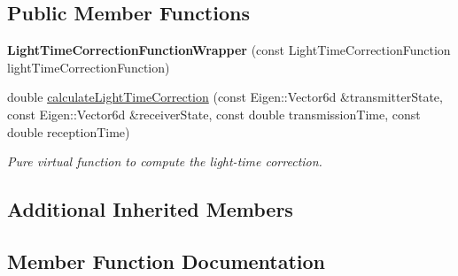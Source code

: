 \subsection*{Public Member Functions}
\begin{DoxyCompactItemize}
\item 
{\bfseries Light\+Time\+Correction\+Function\+Wrapper} (const Light\+Time\+Correction\+Function light\+Time\+Correction\+Function)\hypertarget{classtudat_1_1observation__models_1_1LightTimeCorrectionFunctionWrapper_a60ad1501648b6623ca9c65f9ec364d70}{}\label{classtudat_1_1observation__models_1_1LightTimeCorrectionFunctionWrapper_a60ad1501648b6623ca9c65f9ec364d70}

\item 
double \hyperlink{classtudat_1_1observation__models_1_1LightTimeCorrectionFunctionWrapper_ad789bf281633cc47e9bae2ef5615101b}{calculate\+Light\+Time\+Correction} (const Eigen\+::\+Vector6d \&transmitter\+State, const Eigen\+::\+Vector6d \&receiver\+State, const double transmission\+Time, const double reception\+Time)
\begin{DoxyCompactList}\small\item\em Pure virtual function to compute the light-\/time correction. \end{DoxyCompactList}\end{DoxyCompactItemize}
\subsection*{Additional Inherited Members}


\subsection{Member Function Documentation}
